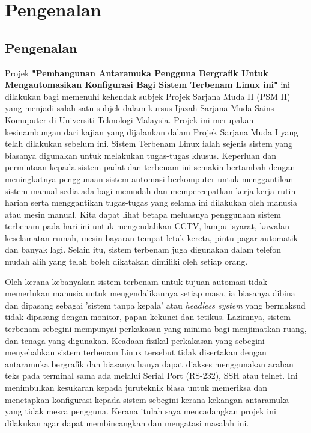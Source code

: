 \chapter{Pengenalan}\label{c1}%

\section{Pengenalan}
Projek \textbf{"Pembangunan Antaramuka Pengguna Bergrafik Untuk Mengautomasikan Konfigurasi Bagi Sistem Terbenam Linux ini"} ini dilakukan bagi memenuhi kehendak subjek Projek Sarjana Muda II (PSM II) yang menjadi salah satu subjek dalam kursus Ijazah Sarjana Muda Sains Komuputer di Universiti Teknologi Malaysia. Projek ini merupakan kesinambungan dari kajian yang dijalankan dalam Projek Sarjana Muda I yang telah dilakukan sebelum ini.
Sistem Terbenam Linux ialah sejenis sistem yang biasanya digunakan untuk melakukan tugas-tugas khusus. Keperluan dan permintaan kepada sistem padat dan terbenam ini semakin bertambah dengan meningkatnya penggunaan sistem automasi berkomputer untuk menggantikan sistem manual sedia ada bagi memudah dan mempercepatkan kerja-kerja rutin harian serta menggantikan tugas-tugas yang selama ini dilakukan oleh manusia atau mesin manual. Kita dapat lihat betapa meluasnya penggunaan sistem terbenam pada hari ini untuk mengendalikan CCTV, lampu isyarat, kawalan keselamatan rumah, mesin bayaran tempat letak kereta, pintu pagar automatik dan banyak lagi. Selain itu, sistem terbenam juga digunakan dalam telefon mudah alih yang telah boleh dikatakan dimiliki oleh setiap orang.

Oleh kerana kebanyakan sistem terbenam untuk tujuan automasi tidak memerlukan manusia untuk mengendalikannya setiap masa, ia biasanya dibina dan dipasang sebagai 'sistem tanpa kepala' atau \textit{headless system}\cite{w2} yang bermaksud tidak dipasang dengan monitor, papan kekunci dan tetikus. Lazimnya, sistem terbenam sebegini mempunyai perkakasan yang minima bagi menjimatkan ruang, dan tenaga yang digunakan. Keadaan fizikal perkakasan yang sebegini menyebabkan sistem terbenam Linux tersebut tidak disertakan dengan antaramuka bergrafik dan biasanya hanya dapat diakses menggunakan arahan teks pada terminal sama ada melalui Serial Port (RS-232), SSH atau telnet. Ini menimbulkan kesukaran kepada juruteknik biasa untuk memeriksa dan menetapkan konfigurasi kepada sistem sebegini kerana kekangan antaramuka yang tidak mesra pengguna. Kerana itulah saya mencadangkan projek ini dilakukan agar dapat membincangkan dan mengatasi masalah ini.

